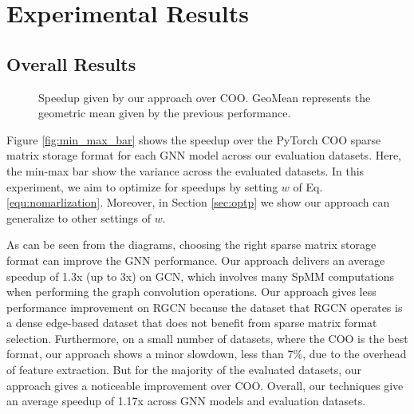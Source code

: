 \vspace{-4mm}
\section{Experimental Results}
\vspace{-3mm}
\subsection{Overall Results}
\vspace{-2mm}

\begin{figure}[t!]
\centering
{}%
%
\vspace{-3mm}
\caption{Speedup given by our approach over COO. GeoMean represents the geometric mean given by the previous performance. }
\vspace{-3mm}
\label{fig:MinMaxBar}
\end{figure}




Figure \ref{fig:min_max_bar} shows the speedup over the PyTorch COO sparse matrix storage format for each GNN model across our evaluation datasets. Here, the min-max bar show the variance across the evaluated datasets. In this experiment, we aim to optimize for speedups by setting $w$ of Eq. \ref{equ:nomarlization}. Moreover, in Section \ref{sec:optp} we show our approach can generalize to other settings of $w$.

As can be seen from the diagrams, choosing the right sparse matrix storage format can improve the GNN performance. Our approach delivers an average speedup of 1.3x (up to 3x) on GCN, which involves many SpMM computations when performing the graph convolution operations. Our approach gives less performance improvement on RGCN because the dataset that RGCN operates is a dense edge-based dataset that does not benefit from sparse matrix format selection. Furthermore, on a small number of datasets, where the COO is the best format, our approach shows a minor slowdown, less than 7\%, due to the overhead of feature extraction. But for the majority of the evaluated datasets, our approach gives a noticeable improvement over COO. Overall, our techniques give an average speedup of 1.17x across GNN models and evaluation datasets.

